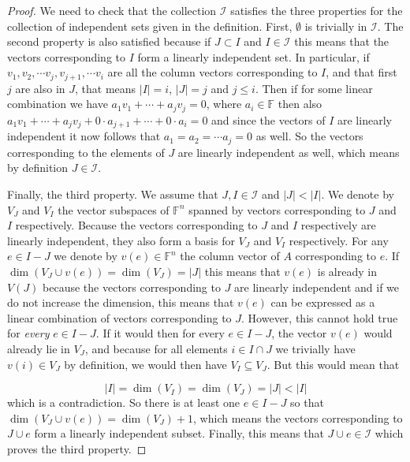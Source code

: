 \begin{proof}
    We need to check that the collection $\mathcal{I}$ satisfies the three properties for the collection of independent sets given in the definition. First, $\emptyset$ is trivially in $\mathcal{I}$. The second property is also satisfied because if $J \subset I$ and $I \in \mathcal{I}$ this means that the vectors corresponding to $I$ form a linearly independent set. In particular, if $v_1, v_2, \cdots v_j, v_{j+1}, \cdots v_{i}$ are all the column vectors corresponding to $I$, and that first $j$ are also in $J$, that means $|I| = i$, $|J| = j$ and $j \leq i$. Then if for some linear combination we have $a_1v_1 + \cdots + a_jv_j = 0$, where $a_i \in \mathbb{F}$ then also $a_1v_1 + \cdots + a_jv_j + 0 \cdot a_{j+1} + \cdots + 0 \cdot a_i = 0$ and since the vectors of $I$ are linearly independent it now follows that $a_1 = a_2 = \cdots a_j = 0$ as well. So the vectors corresponding to the elements of $J$ are linearly independent as well, which means by definition $J \in \mathcal{I}$.

    Finally, the third property. We assume that $J, I \in \mathcal{I}$ and $|J| < |I|$. We denote by $V_J$ and $V_I$ the vector subspaces of $\mathbb{F}^n$ spanned by vectors corresponding to $J$ and $I$ respectively. Because the vectors corresponding to $J$ and $I$ respectively are linearly independent, they also form a basis for $V_J$ and $V_I$ respectively. For any $e \in I - J$ we denote by $v(e) \in \mathbb{F}^n$ the column vector of $A$ corresponding to $e$. If $\dim (V_J \cup v(e)) = \dim (V_J) = |J|$ this means that $v(e)$ is already in $V(J)$ because the vectors corresponding to $J$ are linearly independent and if we do not increase the dimension, this means that $v(e)$ can be expressed as a linear combination of vectors corresponding to $J$. However, this cannot hold true for \textit{every} $e \in I - J$. If it would then for every $e \in I - J$, the vector $v(e) $ would already lie in $ V_J$, and because for all elements $i \in I \cap J$ we trivially have $v(i) \in V_J$ by definition, we would then have $V_I \subseteq V_J$. But this would mean that 

    $$|I| = \dim(V_I) = \dim(V_J) = |J| < |I|$$
     which is a contradiction. So there is at least one $e \in I - J$ so that $\dim(V_J \cup v(e)) = \dim(V_J) + 1$, which means the vectors corresponding to $J \cup e$ form a linearly independent subset. Finally, this means that $J \cup e \in \mathcal{I}$ which proves the third property.
\end{proof}

